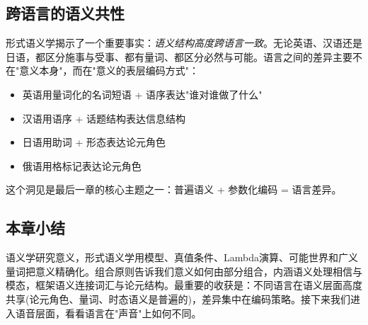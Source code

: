 \subsection{跨语言的语义共性}

形式语义学揭示了一个重要事实：\emph{语义结构高度跨语言一致}。无论英语、汉语还是日语，都区分施事与受事、都有量词、都区分必然与可能。语言之间的差异主要不在"意义本身"，而在"意义的表层编码方式"：
\begin{itemize}
    \item 英语用量词化的名词短语 + 语序表达"谁对谁做了什么"
    \item 汉语用语序 + 话题结构表达信息结构
    \item 日语用助词 + 形态表达论元角色
    \item 俄语用格标记表达论元角色
\end{itemize}

这个洞见是最后一章的核心主题之一：普遍语义 + 参数化编码 = 语言差异。

\subsection{本章小结}

语义学研究意义，形式语义学用模型、真值条件、Lambda演算、可能世界和广义量词把意义精确化。组合原则告诉我们意义如何由部分组合，内涵语义处理相信与模态，框架语义连接词汇与论元结构。最重要的收获是：不同语言在语义层面高度共享(论元角色、量词、时态语义是普遍的)，差异集中在编码策略。接下来我们进入语音层面，看看语言在"声音"上如何不同。
